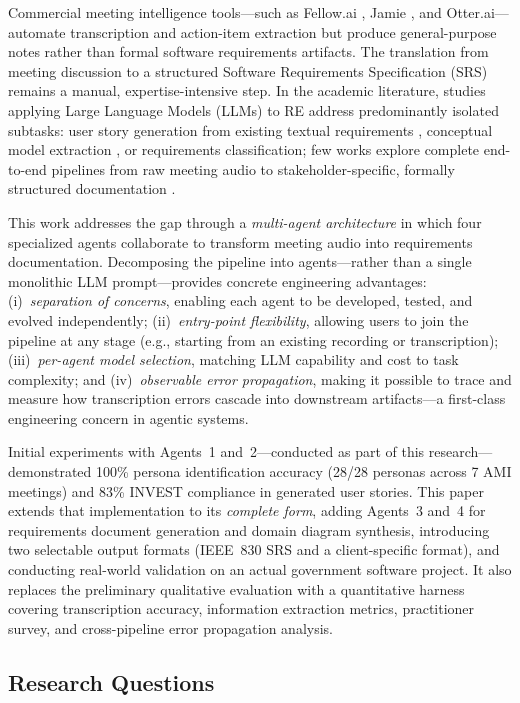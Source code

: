 \documentclass[sigconf]{acmart}
\begin{document}
Commercial meeting intelligence tools—such as Fellow.ai
\cite{fellow2025}, Jamie \cite{jamie2025}, and Otter.ai—automate
transcription and action-item extraction but produce general-purpose
notes rather than formal software requirements artifacts. The
translation from meeting discussion to a structured Software
Requirements Specification (SRS) remains a manual, expertise-intensive
step. In the academic literature, studies applying Large Language
Models (LLMs) to RE address predominantly isolated subtasks: user
story generation from existing textual requirements
\cite{delgado2024aidriven}, conceptual model extraction
\cite{ren2024combining}, or requirements classification; few works
explore complete end-to-end pipelines from raw meeting audio to
stakeholder-specific, formally structured documentation
\cite{motger2025share}.

This work addresses the gap through a \emph{multi-agent architecture}
in which four specialized agents collaborate to transform meeting audio
into requirements documentation. Decomposing the pipeline into
agents—rather than a single monolithic LLM prompt—provides concrete
engineering advantages: (i)~\textit{separation of concerns}, enabling
each agent to be developed, tested, and evolved independently;
(ii)~\textit{entry-point flexibility}, allowing users to join the
pipeline at any stage (e.g., starting from an existing recording or
transcription); (iii)~\textit{per-agent model selection}, matching LLM
capability and cost to task complexity; and (iv)~\textit{observable
error propagation}, making it possible to trace and measure how
transcription errors cascade into downstream artifacts—a first-class
engineering concern in agentic systems.

Initial experiments with Agents~1 and~2—conducted as part of this
research—demonstrated 100\% persona identification accuracy (28/28
personas across 7 AMI meetings) and 83\% INVEST compliance in
generated user stories. This paper extends that implementation to its
\emph{complete form}, adding Agents~3 and~4 for requirements document
generation and domain diagram synthesis, introducing two selectable
output formats (IEEE~830 SRS and a client-specific format), and
conducting real-world validation on an actual government software
project. It also replaces the preliminary qualitative evaluation with
a quantitative harness covering transcription accuracy, information
extraction metrics, practitioner survey, and cross-pipeline error
propagation analysis.

\subsection{Research Questions}
\end{document}
